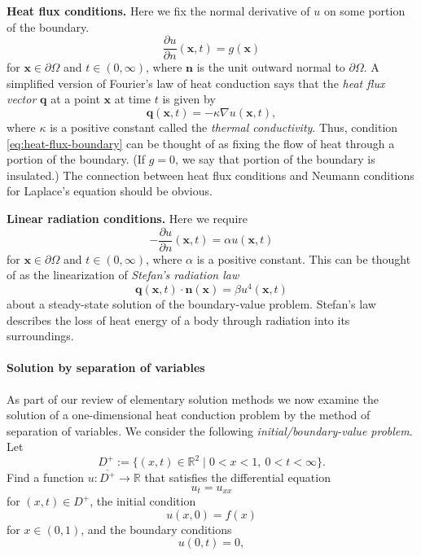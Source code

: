 \textbf{Heat flux conditions.} Here we fix the normal derivative of $u$ on some portion of the boundary.
\begin{equation}\label{eq:heat-flux-boundary}
\dfrac{\partial u}{\partial n}(\bm{x},t)=g(\bm{x})
\end{equation}
for $\bm{x}\in\partial\Omega$ and $t\in(0,\infty)$, where $\bm{n}$ is the unit outward normal to $\partial\Omega$. A simplified version of Fourier's law of heat conduction says that the \emph{heat flux vector} $\bm{q}$ at a point $\bm{x}$ at time $t$ is given by
\begin{equation}\label{eq:fourier-heat-flux-law}
\bm{q}(\bm{x},t)=-\kappa\nabla u(\bm{x},t),
\end{equation}
where $\kappa$ is a positive constant called the \emph{thermal conductivity}. Thus, condition \eqref{eq:heat-flux-boundary} can be thought of as fixing the flow of heat through a portion of the boundary. (If $g=0$, we say that portion of the boundary is insulated.) The connection between heat flux conditions and Neumann conditions for Laplace's equation should be obvious.

\textbf{Linear radiation conditions.} Here we require
\begin{equation}\label{eq:linear-radiation-boundary}
-\dfrac{\partial u}{\partial n}(\bm{x},t)=\alpha u(\bm{x},t)
\end{equation}
for $\bm{x}\in\partial\Omega$ and $t\in(0,\infty)$, where $\alpha$ is a positive constant. This can be thought of as the linearization of \emph{Stefan's radiation law}
\begin{equation}\label{eq:stefan-radiation-law}
\bm{q}(\bm{x},t)\cdot\bm{n}(\bm{x})=\beta u^4(\bm{x},t)
\end{equation}
about a steady-state solution of the boundary-value problem. Stefan's law describes the loss of heat energy of a body through radiation into its surroundings.

\paragraph*{Solution by separation of variables}

As part of our review of elementary solution methods we now examine the solution of a one-dimensional heat conduction problem by the method of separation of variables. We consider the following \emph{initial/boundary-value problem}. Let
\[
D^+:=\{(x,t)\in\mathbb{R}^2\mid 0<x<1,\ 0<t<\infty\}.
\]
Find a function $u:\overline{D^+}\to\mathbb{R}$ that satisfies the differential equation
\begin{equation}\label{eq:heat-one-dimensional}
u_t=u_{xx}
\end{equation}
for $(x,t)\in D^+$, the initial condition
\begin{equation}\label{eq:heat-interval-initial}
u(x,0)=f(x)
\end{equation}
for $x\in(0,1)$, and the boundary conditions
\begin{equation}\label{eq:heat-left-boundary}
u(0,t)=0,
\end{equation}

